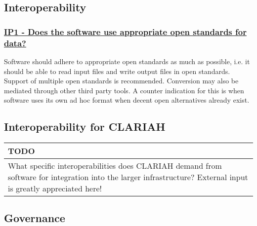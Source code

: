 \documentclass[a4paper,11pt]{article}
\newenvironment{TODO}{
\begin{center}
    \begin{tabular}[h!]{|p{0.8\textwidth}|}
    \hline
    {\bf TODO}\\\hline}
{   \\\hline
    \end{tabular}
\end{center}}
\newcommand{\criterion}[2]{\subsubsection*{\underline{#1 - #2}}\label{id:#1}}
\newcommand\CheckTable{%
  \begin{tabular}{ccccc}
    No & Minimal & Adequate & Good & Perfect \\
    0 & 1 & 2 & 3 & 4 \\
    \hline
    $\square$ & $\square$ & $\square$ & $\square$ & $\square$ \\
  \end{tabular}%
}
\begin{document}

\subsection{Interoperability}\label{sec:int}

\newcommand{\ipOneID}{IP1}
\newcommand{\ipOneText}{Does the software use appropriate open standards for data?}
\criterion{\ipOneID}{\ipOneText}

Software should adhere to appropriate open standards as much as possible, i.e.
it should be able to read input files and write output files in open
standards. Support of multiple open standards is recommended. Conversion may
also be mediated through other third party tools. A counter indication for this
is when software uses its own ad hoc format when decent open alternatives
already exist.


\subsection{Interoperability for CLARIAH}\label{sec:intCLA}


\begin{TODO} 
What specific interoperabilities does CLARIAH demand from software for
integration into the larger infrastructure?  External input is greatly
appreciated here!
\end{TODO}


\subsection{Governance}\label{sec:gov}


\end{document}

